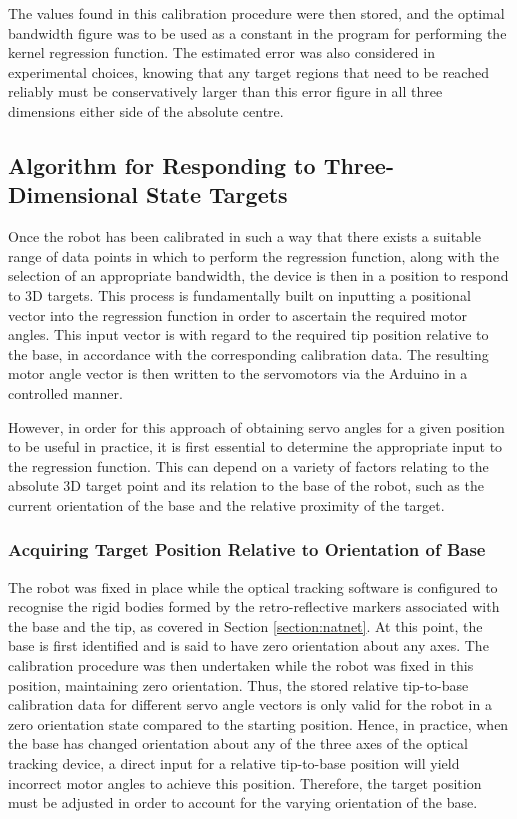 \documentclass[11pt]{article}
\begin{document}
The values found in this calibration procedure were then stored, and the optimal bandwidth figure was to be used as a constant in the program for performing the kernel regression function. The estimated error was also considered in experimental choices, knowing that any target regions that need to be reached reliably must be conservatively larger than this error figure in all three dimensions either side of the absolute centre. 

\pagebreak 
\subsection{Algorithm for Responding to Three-Dimensional State Targets}
\label{section:algorithmForResponse}

Once the robot has been calibrated in such a way that there exists a suitable range of data points in which to perform the regression function, along with the selection of an appropriate bandwidth, the device is then in a position to respond to 3D targets.
This process is fundamentally built on inputting a positional vector into the regression function in order to ascertain the required motor angles. This input vector is with regard to the required tip position relative to the base, in accordance with the corresponding calibration data. The resulting motor angle vector is then written to the servomotors via the Arduino in a controlled manner. 

However, in order for this approach of obtaining servo angles for a given position to be useful in practice, it is first essential to determine the appropriate input to the regression function. This can depend on a variety of factors relating to the absolute 3D target point and its relation to the base of the robot, such as the current orientation of the base and the relative proximity of the target.

\subsubsection{Acquiring Target Position Relative to Orientation of Base}
\label{section:relativeToBaseOrientation}

The robot was fixed in place while the optical tracking software is configured to recognise the rigid bodies formed by the retro-reflective markers associated with the base and the tip, as covered in Section \ref{section:natnet}. At this point, the base is first identified and is said to have zero orientation about any axes. The calibration procedure was then undertaken while the robot was fixed in this position, maintaining zero orientation. Thus, the stored relative tip-to-base calibration data for different servo angle vectors is only valid for the robot in a zero orientation state compared to the starting position. Hence, in practice, when the base has changed orientation about any of the three axes of the optical tracking device, a direct input for a relative tip-to-base position will yield incorrect motor angles to achieve this position. Therefore, the target position must be adjusted in order to account for the varying orientation of the base.
\end{document}
